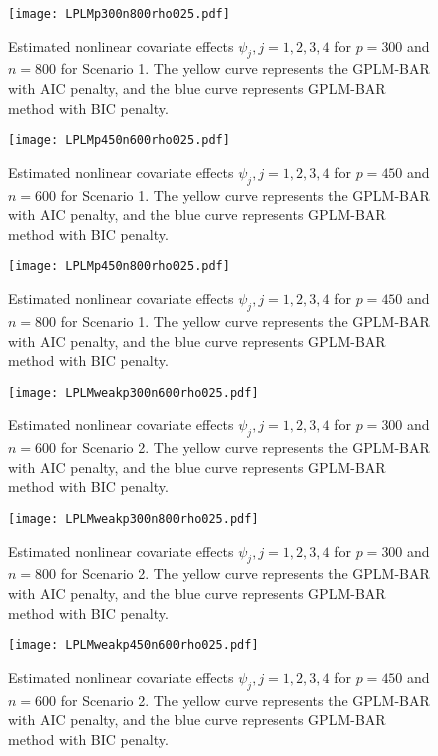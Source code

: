 \documentclass[11pt]{article}
\begin{document}
\begin{figure}
\centering
\texttt{[image: LPLMp300n800rho025.pdf]}
\caption{Estimated nonlinear covariate effects $\psi_j, j=1,2,3,4$ for $p=300$ and $n=800$ for Scenario 1. The yellow curve represents the GPLM-BAR with AIC penalty, and the blue curve represents GPLM-BAR method with BIC penalty.}\label{ESTS1p300n800}
\end{figure}

\begin{figure}
\centering
\texttt{[image: LPLMp450n600rho025.pdf]}
\caption{Estimated nonlinear covariate effects $\psi_j, j=1,2,3,4$ for $p=450$ and $n=600$ for Scenario 1. The yellow curve represents the GPLM-BAR with AIC penalty, and the blue curve represents GPLM-BAR method with BIC penalty.}\label{ESTS1p450n600}
\end{figure}

\begin{figure}
\centering
\texttt{[image: LPLMp450n800rho025.pdf]}
\caption{Estimated nonlinear covariate effects $\psi_j, j=1,2,3,4$ for $p=450$ and $n=800$ for Scenario 1. The yellow curve represents the GPLM-BAR with AIC penalty, and the blue curve represents GPLM-BAR method with BIC penalty.}\label{ESTS1p450n800}
\end{figure}

\begin{figure}
\centering
\texttt{[image: LPLMweakp300n600rho025.pdf]}
\caption{Estimated nonlinear covariate effects $\psi_j, j=1,2,3,4$ for $p=300$ and $n=600$ for Scenario 2. The yellow curve represents the GPLM-BAR with AIC penalty, and the blue curve represents GPLM-BAR method with BIC penalty.}\label{ESTS2p300n600}
\end{figure}

\begin{figure} 
\centering
\texttt{[image: LPLMweakp300n800rho025.pdf]}
\caption{Estimated nonlinear covariate effects $\psi_j, j=1,2,3,4$ for $p=300$ and $n=800$ for Scenario 2. The yellow curve represents the GPLM-BAR with AIC penalty, and the blue curve represents GPLM-BAR method with BIC penalty.}\label{ESTS2p300n800}
\end{figure}

\begin{figure}
\centering
\texttt{[image: LPLMweakp450n600rho025.pdf]}
\caption{Estimated nonlinear covariate effects $\psi_j, j=1,2,3,4$ for $p=450$ and $n=600$ for Scenario 2. The yellow curve represents the GPLM-BAR with AIC penalty, and the blue curve represents GPLM-BAR method with BIC penalty.}\label{ESTS2p450n600}
\end{figure}
\end{document}
